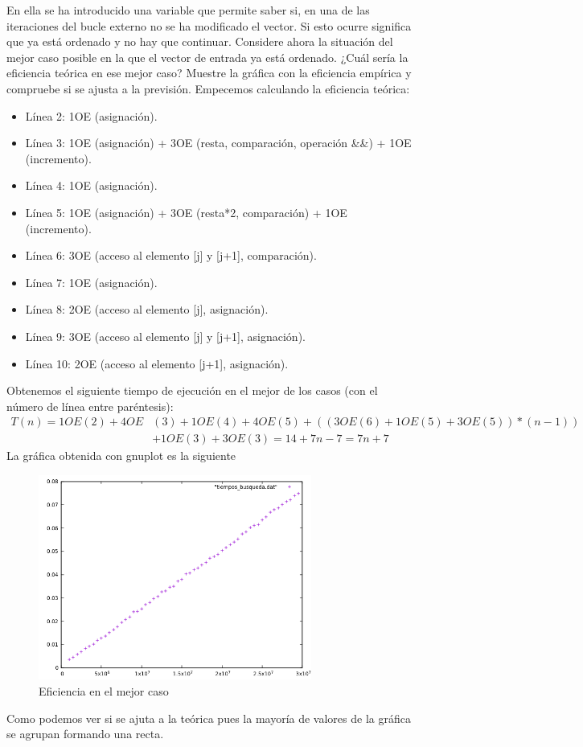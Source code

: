 \documentclass{article}
\begin{document}
En ella se ha introducido una variable que permite saber si, en una de las iteraciones del
bucle externo no se ha modificado el vector. Si esto ocurre significa que ya está ordenado
y no hay que continuar.
Considere ahora la situación del mejor caso posible en la que el vector de entrada ya está
ordenado. ¿Cuál sería la eficiencia teórica en ese mejor caso? Muestre la gráfica con la
eficiencia empírica y compruebe si se ajusta a la previsión.
\clearpage
Empecemos calculando la eficiencia teórica:
\begin{itemize}
	\item Línea 2: 1OE (asignación).
	\item Línea 3: 1OE (asignación) + 3OE (resta, comparación,
          operación \&\&) + 1OE (incremento).
	\item Línea 4: 1OE (asignación).
	\item Línea 5: 1OE (asignación) + 3OE (resta*2, comparación) + 1OE (incremento).
	\item Línea 6: 3OE (acceso al elemento [j] y [j+1], comparación).
	\item Línea 7: 1OE (asignación).
	\item Línea 8: 2OE (acceso al elemento [j], asignación).
	\item Línea 9: 3OE (acceso al elemento [j] y [j+1], asignación).
	\item Línea 10: 2OE (acceso al elemento [j+1], asignación).
\end{itemize}
Obtenemos el siguiente tiempo de ejecución en el mejor de los casos
(con el número de línea entre paréntesis):
\begin{align*}
  T(n)= 1OE(2) + 4OE&(3) + 1OE(4) + 4OE(5) + (( 3OE(6) + 1OE(5) +
  3OE(5) )*(n-1))\\& + 1OE(3) + 3OE(3) = 14+7n-7 = 7n+7
\end{align*}
La gráfica obtenida con gnuplot es la siguiente
\begin{figure}[H]
  \caption{Eficiencia en el mejor caso}
  \centering
  \includegraphics[width=0.8\textwidth]{ejer5/grafica.png}
\end{figure}
Como podemos ver si se ajuta a la teórica pues la mayoría de valores
de la gráfica se agrupan formando una recta.
\clearpage
\end{document}

